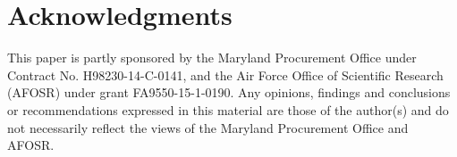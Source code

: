
\section{Acknowledgments}

This paper is partly sponsored by the Maryland Procurement Office under Contract No. H98230-14-C-0141, and the Air Force Office of Scientific Research (AFOSR) under grant FA9550-15-1-0190. Any opinions, findings and conclusions or recommendations expressed in this material are those of the author(s) and do not necessarily reflect the views of the Maryland Procurement Office and AFOSR.
